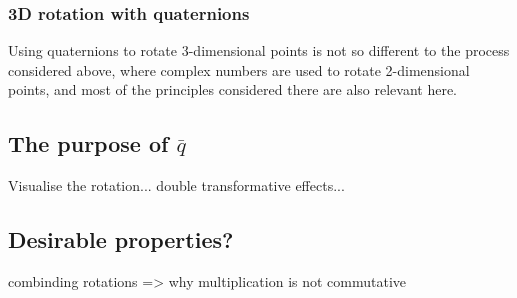\documentclass[10pt]{article}
\begin{document}
\subsubsection{3D rotation with quaternions}

Using quaternions to rotate 3-dimensional points is not so different to the process considered above, where complex numbers are used to rotate 2-dimensional points, and most of the principles considered there are also relevant here.

\subsection{The purpose of $\bar{q}$}

Visualise the rotation... double transformative effects...

\subsection{Desirable properties?}

combinding rotations => why multiplication is not commutative

\pagebreak

\printbibliography
\end{document}
